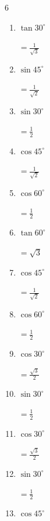 \begin{multicols}{6}
\begin{enumerate}
        $\displaystyle =1$

  \item $\displaystyle \tan{30^\circ}$

        $\displaystyle =\frac{1}{\sqrt{3}}$

\columnbreak %

  \item $\displaystyle \sin{45^\circ}$

        $\displaystyle =\frac{1}{\sqrt{2}}$

  \item $\displaystyle \sin{30^\circ}$

        $\displaystyle =\frac{1}{2}$

  \item $\displaystyle \cos{45^\circ}$

        $\displaystyle =\frac{1}{\sqrt{2}}$

  \item $\displaystyle \cos{60^\circ}$

        $\displaystyle =\frac{1}{2}$

  \item $\displaystyle \tan{60^\circ}$

        $\displaystyle =\sqrt{3}$

  \item $\displaystyle \cos{45^\circ}$

        $\displaystyle =\frac{1}{\sqrt{2}}$

  \item $\displaystyle \cos{60^\circ}$

        $\displaystyle =\frac{1}{2}$

  \item $\displaystyle \cos{30^\circ}$

        $\displaystyle =\frac{\sqrt{3}}{2}$

  \item $\displaystyle \sin{30^\circ}$

        $\displaystyle =\frac{1}{2}$

  \item $\displaystyle \cos{30^\circ}$

        $\displaystyle =\frac{\sqrt{3}}{2}$

  \item $\displaystyle \sin{30^\circ}$

        $\displaystyle =\frac{1}{2}$

  \item $\displaystyle \cos{45^\circ}$


\end{enumerate}
\end{multicols}
